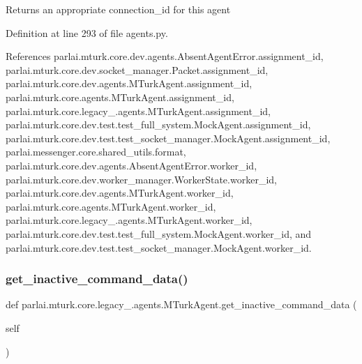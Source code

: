 \begin{DoxyVerb}Returns an appropriate connection_id for this agent\end{DoxyVerb}
 

Definition at line 293 of file agents.\+py.



References parlai.\+mturk.\+core.\+dev.\+agents.\+Absent\+Agent\+Error.\+assignment\+\_\+id, parlai.\+mturk.\+core.\+dev.\+socket\+\_\+manager.\+Packet.\+assignment\+\_\+id, parlai.\+mturk.\+core.\+dev.\+agents.\+M\+Turk\+Agent.\+assignment\+\_\+id, parlai.\+mturk.\+core.\+agents.\+M\+Turk\+Agent.\+assignment\+\_\+id, parlai.\+mturk.\+core.\+legacy\+\_.\+agents.\+M\+Turk\+Agent.\+assignment\+\_\+id, parlai.\+mturk.\+core.\+dev.\+test.\+test\+\_\+full\+\_\+system.\+Mock\+Agent.\+assignment\+\_\+id, parlai.\+mturk.\+core.\+dev.\+test.\+test\+\_\+socket\+\_\+manager.\+Mock\+Agent.\+assignment\+\_\+id, parlai.\+messenger.\+core.\+shared\+\_\+utils.\+format, parlai.\+mturk.\+core.\+dev.\+agents.\+Absent\+Agent\+Error.\+worker\+\_\+id, parlai.\+mturk.\+core.\+dev.\+worker\+\_\+manager.\+Worker\+State.\+worker\+\_\+id, parlai.\+mturk.\+core.\+dev.\+agents.\+M\+Turk\+Agent.\+worker\+\_\+id, parlai.\+mturk.\+core.\+agents.\+M\+Turk\+Agent.\+worker\+\_\+id, parlai.\+mturk.\+core.\+legacy\+\_.\+agents.\+M\+Turk\+Agent.\+worker\+\_\+id, parlai.\+mturk.\+core.\+dev.\+test.\+test\+\_\+full\+\_\+system.\+Mock\+Agent.\+worker\+\_\+id, and parlai.\+mturk.\+core.\+dev.\+test.\+test\+\_\+socket\+\_\+manager.\+Mock\+Agent.\+worker\+\_\+id.

\mbox{\label{classparlai_1_1mturk_1_1core_1_1legacy__2018_1_1agents_1_1MTurkAgent_aa67e2dfc302ace9edd9d12a79ff24521}} 
\subsubsection{\texorpdfstring{get\+\_\+inactive\+\_\+command\+\_\+data()}{get\_inactive\_command\_data()}}
{\footnotesize\ttfamily def parlai.\+mturk.\+core.\+legacy\+\_.\+agents.\+M\+Turk\+Agent.\+get\+\_\+inactive\+\_\+command\+\_\+data (\begin{DoxyParamCaption}\item[{}]{self }\end{DoxyParamCaption})}

